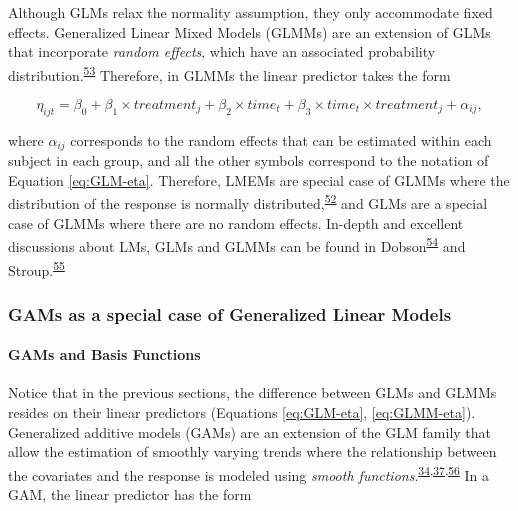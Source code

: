 \documentclass[
]{article}
\begin{document}
Although GLMs relax the normality assumption, they only accommodate fixed effects. Generalized Linear Mixed Models (GLMMs) are an extension of GLMs that incorporate \emph{random effects}, which have an associated probability distribution.\textsuperscript{\protect\hyperlink{ref-mcculloch2001}{53}} Therefore, in GLMMs the linear predictor takes the form

\begin{equation}
\eta_{ijt}=\beta_0+\beta_1 \times treatment_{j} + \beta_2 \times time_{t} +\beta_3 \times time_{t}\times treatment_{j}+\alpha_{ij},
\label{eq:GLMM-eta}
\end{equation}

where \(\alpha_{ij}\) corresponds to the random effects that can be estimated within each subject in each group, and all the other symbols correspond to the notation of Equation \eqref{eq:GLM-eta}. Therefore, LMEMs are special case of GLMMs where the distribution of the response is normally distributed,\textsuperscript{\protect\hyperlink{ref-nelder1972}{52}} and GLMs are a special case of GLMMs where there are no random effects. In-depth and excellent discussions about LMs, GLMs and GLMMs can be found in Dobson\textsuperscript{\protect\hyperlink{ref-dobson2008}{54}} and Stroup.\textsuperscript{\protect\hyperlink{ref-stroup2013}{55}}

\hypertarget{GAM-theory}{%
\subsubsection{GAMs as a special case of Generalized Linear Models}\label{GAM-theory}}

\hypertarget{gams-and-basis-functions}{%
\paragraph{GAMs and Basis Functions}\label{gams-and-basis-functions}}

Notice that in the previous sections, the difference between GLMs and GLMMs resides on their linear predictors (Equations \eqref{eq:GLM-eta}, \eqref{eq:GLMM-eta}). Generalized additive models (GAMs) are an extension of the GLM family that allow the estimation of smoothly varying trends where the relationship between the covariates and the response is modeled using \emph{smooth functions}.\textsuperscript{\protect\hyperlink{ref-simpson2018}{34},\protect\hyperlink{ref-wood2017}{37},\protect\hyperlink{ref-hastie1987}{56}} In a GAM, the linear predictor has the form
\end{document}
